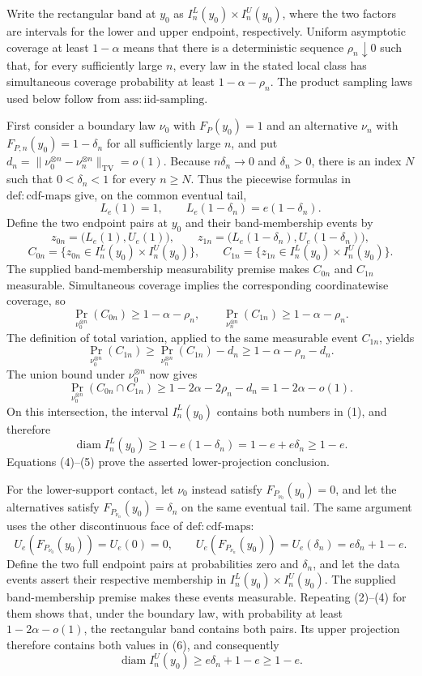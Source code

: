 Write the rectangular band at \(y_0\) as \(I_n^L(y_0)\times I_n^U(y_0)\), where the two factors are intervals for the lower and upper endpoint, respectively.  Uniform asymptotic coverage at least \(1-\alpha\) means that there is a deterministic sequence \(\rho_n\downarrow0\) such that, for every sufficiently large \(n\), every law in the stated local class has simultaneous coverage probability at least \(1-\alpha-\rho_n\).  The product sampling laws used below follow from \(\mathrm{ass:iid\text{-}sampling}\).

First consider a boundary law \(\nu_0\) with \(F_P(y_0)=1\) and an alternative \(\nu_n\) with \(F_{P,n}(y_0)=1-\delta_n\) for all sufficiently large \(n\), and put \(d_n=\lVert\nu_0^{\otimes n}-\nu_n^{\otimes n}\rVert_{\mathrm{TV}}=o(1)\).  Because \(n\delta_n\to0\) and \(\delta_n>0\), there is an index \(N\) such that \(0<\delta_n<1\) for every \(n\ge N\).  Thus the piecewise formulas in \(\mathrm{def:cdf\text{-}maps}\) give, on the common eventual tail,
\[
  L_e(1)=1,
  \qquad
  L_e(1-\delta_n)=e(1-\delta_n).
  \tag{1}
\]
Define the two endpoint pairs at \(y_0\) and their band-membership events by
\[
  z_{0n}=\bigl(L_e(1),U_e(1)\bigr),
  \qquad
  z_{1n}=\bigl(L_e(1-\delta_n),U_e(1-\delta_n)\bigr),
\]
\[
  C_{0n}=\{z_{0n}\in I_n^L(y_0)\times I_n^U(y_0)\},
  \qquad
  C_{1n}=\{z_{1n}\in I_n^L(y_0)\times I_n^U(y_0)\}.
\]
The supplied band-membership measurability premise makes \(C_{0n}\) and \(C_{1n}\) measurable.  Simultaneous coverage implies the corresponding coordinatewise coverage, so
\[
  \Pr_{\nu_0^{\otimes n}}(C_{0n})\ge1-\alpha-\rho_n,
  \qquad
  \Pr_{\nu_n^{\otimes n}}(C_{1n})\ge1-\alpha-\rho_n.
  \tag{2}
\]
The definition of total variation, applied to the same measurable event \(C_{1n}\), yields
\[
  \Pr_{\nu_0^{\otimes n}}(C_{1n})
  \ge \Pr_{\nu_n^{\otimes n}}(C_{1n})-d_n
  \ge1-\alpha-\rho_n-d_n.
  \tag{3}
\]
The union bound under \(\nu_0^{\otimes n}\) now gives
\[
  \Pr_{\nu_0^{\otimes n}}(C_{0n}\cap C_{1n})
  \ge1-2\alpha-2\rho_n-d_n
  =1-2\alpha-o(1).
  \tag{4}
\]
On this intersection, the interval \(I_n^L(y_0)\) contains both numbers in (1), and therefore
\[
  \operatorname{diam} I_n^L(y_0)
  \ge 1-e(1-\delta_n)
  =1-e+e\delta_n
  \ge1-e.
  \tag{5}
\]
Equations (4)--(5) prove the asserted lower-projection conclusion.

For the lower-support contact, let \(\nu_0\) instead satisfy \(F_{P_{\nu_0}}(y_0)=0\), and let the alternatives satisfy \(F_{P_{\nu_n}}(y_0)=\delta_n\) on the same eventual tail.  The same argument uses the other discontinuous face of \(\mathrm{def:cdf\text{-}maps}\):
\[
  U_e(F_{P_{\nu_0}}(y_0))=U_e(0)=0,
  \qquad
  U_e(F_{P_{\nu_n}}(y_0))=U_e(\delta_n)
    =e\delta_n+1-e.
  \tag{6}
\]
Define the two full endpoint pairs at probabilities zero and \(\delta_n\), and let the data events assert their respective membership in \(I_n^L(y_0)\times I_n^U(y_0)\).  The supplied band-membership premise makes these events measurable.  Repeating (2)--(4) for them shows that, under the boundary law, with probability at least \(1-2\alpha-o(1)\), the rectangular band contains both pairs.  Its upper projection therefore contains both values in (6), and consequently
\[
  \operatorname{diam} I_n^U(y_0)
  \ge e\delta_n+1-e
  \ge1-e.
  \tag{7}
\]

